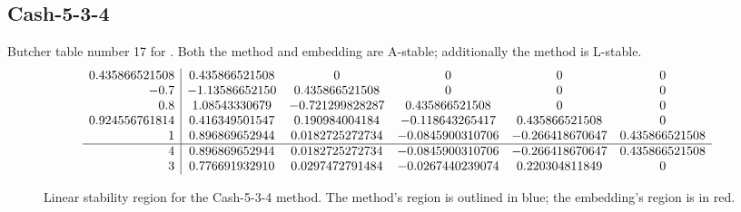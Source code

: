 \documentclass[letterpaper,10pt,english]{sphinxmanual}
\begin{document}
\subsection{Cash-5-3-4}
\label{Butcher:butcher-cash-5-3-4}\label{Butcher:cash-5-3-4}
Butcher table number 17
for {\hyperref[c_interface/User_callable:c.ARKodeSetIRKTableNum]{\emph{}}}.  Both the
method and embedding are A-stable; additionally the method is L-stable.
\begin{gather}
\begin{split}\begin{array}{r|ccccc}
  0.435866521508 & 0.435866521508 & 0 & 0 & 0 & 0 \\
  -0.7 & -1.13586652150 & 0.435866521508 & 0 & 0 & 0 \\
  0.8 & 1.08543330679 & -0.721299828287 & 0.435866521508 & 0 & 0 \\
  0.924556761814 & 0.416349501547 & 0.190984004184 & -0.118643265417 & 0.435866521508 & 0 \\
  1 & 0.896869652944 & 0.0182725272734 & -0.0845900310706 & -0.266418670647 & 0.435866521508 \\
  \hline
  4 & 0.896869652944 & 0.0182725272734 & -0.0845900310706 & -0.266418670647 & 0.435866521508 \\
  3 & 0.776691932910 & 0.0297472791484 & -0.0267440239074 & 0.220304811849 & 0
\end{array}\end{split}\notag
\end{gather}\begin{figure}[htbp]
\centering
\capstart

\caption{Linear stability region for the Cash-5-3-4 method.  The method's
region is outlined in blue; the embedding's region is in red.}\end{figure}
\end{document}
